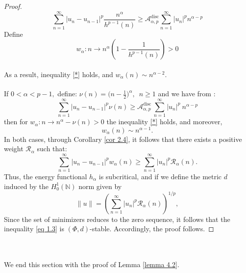 \documentclass[11pt]{amsart}
\newcommand{\1}{[1]}
\begin{document}
\begin{proof}
$$\sum_{n=1}^{\infty} |u_{n}-u_{n-1}|^{p} \frac{n^{\alpha}}{h^{p-1}(n)}  \geq \mathcal{A}^{\text{disc}}_{\alpha,p} 
 \sum_{n=1}^{\infty} |u_{n}|^p n^{\alpha-p}$$
Define $$w_{\alpha}: n \to n^{\alpha} \left( 1 - \frac{1}{h^{p-1}(n)} \right) > 0$$ 
\phantom{.} \\
As a result, inequality \eqref{*} holds, and $w_{\alpha}(n) \sim n^{\alpha-2}$. \\ \\
If $0 < \alpha < p-1,$ define: $\nu(n) = \big(n- \frac{1}{2}\big)^{\alpha}, \, \, \, n\geq 1$ and we have from \cite{Liu12}:
$$\sum_{n=1}^{\infty} |u_{n}-u_{n-1}|^{p} \nu(n) \geq \mathcal{A}^{\text{disc}}_{\alpha,p} \, \sum_{n=1}^{\infty} |u_{n}|^{p} \ n^{\alpha-p} $$  
then for $w_{\alpha}: n \to n^{\alpha}- \nu(n) > 0 $  the inequality \eqref{*} holds, and 
moreover, $$w_{\alpha}(n) \sim n^{\alpha-1}.$$ 
In both cases, through Corollary \ref{cor 2.4}, it follows that there exists a positive weight $\mathcal{R}_{\alpha}$ such that: 
$$\sum_{n=1}^{\infty} |u_{n} - u_{n-1}|^{p} w_{\alpha}(n) \geq \sum_{n=1}^{\infty} |u_n|^p \mathcal{R}_{\alpha}(n).
$$
Thus, the energy functional $h_{\alpha}$ is subcritical, and if we define the metric $d$ induced by the $H_0^{1}(\mathbb{N})$ norm given by  
\[
\|u\| = \left( \sum_{n=1}^{\infty} |u_n|^p \mathcal{R}_{\alpha}(n) \right)^{1/p},  
\]  
Since the set of minimizers reduces to the zero sequence, it follows that the inequality \eqref{eq 1.3} is $(\Phi, d)$-stable. Accordingly, the proof follows.
\end{proof}
\phantom{.} \\ \\ 
We end this section with the proof of Lemma \ref{lemma 4.2}.
\end{document}
